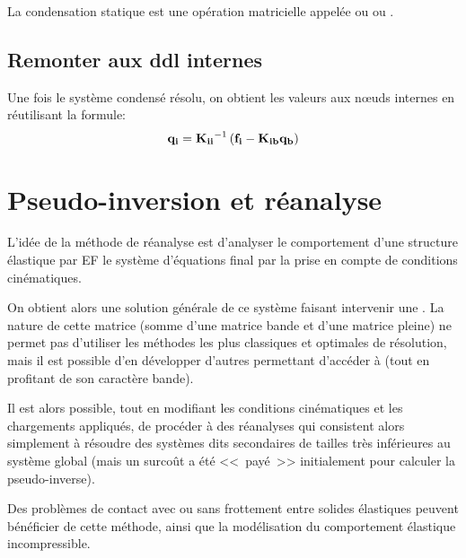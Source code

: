 La condensation statique est une opération matricielle
appelée  ou  ou
.

\medskip
\subsection{Remonter aux ddl internes}
Une fois le système condensé résolu, on obtient les valeurs aux nœuds
internes en réutilisant la formule:
\begin{equation}
\mathbf{q_i} = \mathbf{K_{ii}}^{-1}\left(\mathbf{f_i}-\mathbf{K_{ib}}\mathbf{q_b}\right)
\end{equation}

\medskip
\section{Pseudo-inversion et réanalyse}\label{Sec-PInv}

\medskip
L'idée de la méthode de réanalyse est d'analyser le comportement d'une structure
élastique par EF  le système d'équations final par la prise en
compte de conditions cinématiques.

On obtient alors une solution générale de ce système faisant intervenir une
. La nature de cette matrice (somme
d'une matrice bande et d'une matrice pleine) ne permet pas d'utiliser les méthodes
les plus classiques et optimales de résolution, mais il est possible d'en développer d'autres
permettant d'accéder à  (tout en profitant de son caractère bande).

Il est alors possible, tout en modifiant les conditions cinématiques et les chargements appliqués,
de procéder à des réanalyses qui consistent alors simplement à résoudre des systèmes
dits secondaires de tailles très inférieures au système global (mais un surcoût a été
<<~payé~>> initialement pour calculer la pseudo-inverse).

Des problèmes de contact avec ou sans frottement entre solides élastiques peuvent
bénéficier de cette méthode, ainsi que la modélisation du comportement élastique
incompressible.


